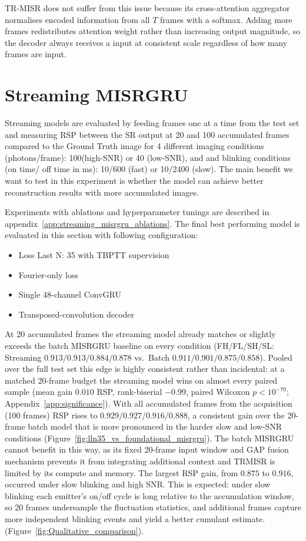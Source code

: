 TR-MISR does not suffer from this issue because its cross-attention aggregator normalises
encoded information from all $T$ frames with a softmax.
Adding more frames redistributes attention weight rather than increasing output magnitude,
so the decoder always receives a input at consistent scale regardless of
how many frames are input.


\section{Streaming MISRGRU}
\label{sec:streaming}
Streaming models are evaluated by feeding frames one at a time from the test set and measuring 
RSP between the SR output at 20 and 100 accumulated frames compared 
to the Ground Truth image for 4 different imaging conditions (photons/frame): 100(high-SNR) or 40 (low-SNR), and
and blinking conditions (on time/ off time in ms): 10/600 (fast) or 10/2400 (slow). The main benefit we want to test
in this experiment is whether the model can achieve better reconstruction results with more accumulated images.

Experiments with ablations and hyperparameter tunings are described in 
appendix~\ref{app:streaming_misrgru_ablations}. The final best performing model is evaluated in this
section with following configuration:
\begin{itemize}
  \item Loss Last N: 35 with TBPTT supervision
  \item Fourier-only loss
  \item Single 48-channel ConvGRU
  \item Transposed-convolution decoder
\end{itemize}

At 20 accumulated frames the streaming model already matches or slightly exceeds the
batch MISRGRU baseline on every condition (FH/FL/SH/SL: Streaming $0.913/0.913/0.884/0.878$
vs.\ Batch $0.911/0.901/0.875/0.858$).
Pooled over the full test set this edge is highly consistent rather than incidental: at a
matched 20-frame budget the streaming model wins on almost every paired sample
(mean gain $0.010$ RSP, rank-biserial $-0.99$, paired Wilcoxon $p < 10^{-70}$;
Appendix~\ref{app:significance}).
With all accumulated frames from the acquisition (100 frames)
RSP rises to $0.929/0.927/0.916/0.888$, a consistent gain over the 20-frame batch model
that is more pronounced in the harder slow and low-SNR conditions
(Figure~\ref{fig:lln35_vs_foundational_misrgru}).
The batch MISRGRU cannot benefit in this way, as its fixed 20-frame input window and GAP fusion mechanism
prevents it from integrating additional context and TRMISR is limited by its compute and memory. 
The largest RSP gain, from $0.875$ to $0.916$, 
occurred under slow blinking and high SNR.
This is expected: under slow blinking each emitter's on/off cycle is long relative to the
accumulation window, so 20 frames undersample the fluctuation statistics, and additional
frames capture more independent blinking events and yield a better cumulant estimate. 
(Figure~\ref{fig:Qualitative_comparison}).


